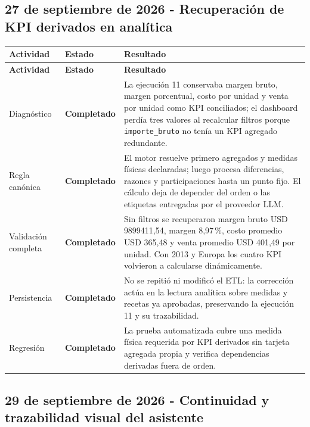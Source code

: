 \documentclass[11pt,letterpaper]{article}
\newcommand{\statusok}{\textcolor{deepgreen}{\textbf{Completado}}}
\newcommand{\file}[1]{\texttt{#1}}
\begin{document}
\subsection{27 de septiembre de 2026 - Recuperación de KPI derivados en analítica}

\begin{longtable}{@{}p{}p{}p{}@{}}
  \toprule
  \textbf{Actividad} & \textbf{Estado} & \textbf{Resultado} \\
  \midrule
  \endfirsthead
  \toprule
  \textbf{Actividad} & \textbf{Estado} & \textbf{Resultado} \\
  \midrule
  \endhead
  Diagnóstico & \statusok & La ejecución 11 conservaba margen bruto, margen porcentual, costo por unidad y venta por unidad como KPI conciliados; el dashboard perdía tres valores al recalcular filtros porque \file{importe\_bruto} no tenía un KPI agregado redundante. \\
  Regla canónica & \statusok & El motor resuelve primero agregados y medidas físicas declaradas; luego procesa diferencias, razones y participaciones hasta un punto fijo. El cálculo deja de depender del orden o las etiquetas entregadas por el proveedor LLM. \\
  Validación completa & \statusok & Sin filtros se recuperaron margen bruto USD 9899411,54, margen 8,97\,\%, costo promedio USD 365,48 y venta promedio USD 401,49 por unidad. Con 2013 y Europa los cuatro KPI volvieron a calcularse dinámicamente. \\
  Persistencia & \statusok & No se repitió ni modificó el ETL: la corrección actúa en la lectura analítica sobre medidas y recetas ya aprobadas, preservando la ejecución 11 y su trazabilidad. \\
  Regresión & \statusok & La prueba automatizada cubre una medida física requerida por KPI derivados sin tarjeta agregada propia y verifica dependencias derivadas fuera de orden. \\
  \bottomrule
\end{longtable}

\subsection{29 de septiembre de 2026 - Continuidad y trazabilidad visual del asistente}
\end{document}
